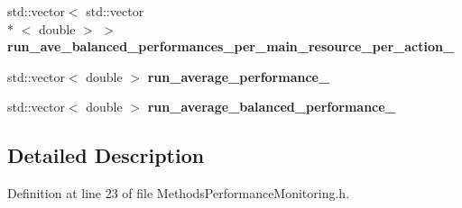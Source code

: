 \begin{DoxyCompactItemize}
\item 
\hypertarget{structStruct__OverallPerformance_af286bc0a54cf35dc819b8b36b4e2f11e}{std\-::vector$<$ std\-::vector\\*
$<$ double $>$ $>$ {\bfseries run\-\_\-ave\-\_\-balanced\-\_\-performances\-\_\-per\-\_\-main\-\_\-resource\-\_\-per\-\_\-action\-\_\-}}\label{structStruct__OverallPerformance_af286bc0a54cf35dc819b8b36b4e2f11e}

\item 
\hypertarget{structStruct__OverallPerformance_a2a228d31c1f56c628e7a597d8c3782b4}{std\-::vector$<$ double $>$ {\bfseries run\-\_\-average\-\_\-performance\-\_\-}}\label{structStruct__OverallPerformance_a2a228d31c1f56c628e7a597d8c3782b4}

\item 
\hypertarget{structStruct__OverallPerformance_a79de6182a1fead9069b00a1db4a87b9a}{std\-::vector$<$ double $>$ {\bfseries run\-\_\-average\-\_\-balanced\-\_\-performance\-\_\-}}\label{structStruct__OverallPerformance_a79de6182a1fead9069b00a1db4a87b9a}

\end{DoxyCompactItemize}


\subsection{Detailed Description}


Definition at line 23 of file Methods\-Performance\-Monitoring.\-h.



